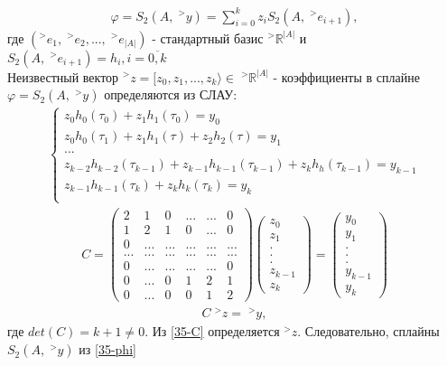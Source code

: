 \documentclass[__main__.tex]{subfiles}
\begin{document}
\begin{gather}
\varphi = S_2(A, \;^>y) = \sum_{i=0}^{k}{z_iS_2(A, \;^>e_{i+1})},
\label{35-phi}
\end{gather}
где $(^>e_1, \;^>e_2, ..., \;^>e_{|A|})$ - стандартный базис $^>\mathbb{R}^{|A|}$ и $S_2(A, \;^>e_{i+1}) = h_i, i=\overline{0, k}$\\
Неизвестный вектор $^>z = [z_0, z_1, ..., z_k \rangle \in \;^>\mathbb{R}^{|A|}$  - коэффициенты в сплайне $\varphi = S_2(A, \;^>y)$ определяются из СЛАУ:
\begin{gather*}
	\begin{cases}
		z_0h_0(\tau_0) + z_1h_1(\tau_0) = y_0\\
		z_0h_0(\tau_1) + z_1h_1(\tau) + z_2h_2(\tau) = y_1\\
		...\\
		z_{k-2}h_{k-2}(\tau_{k-1}) + z_{k-1}h_{k-1}(\tau_{k-1}) + z_kh_h(\tau_{k-1}) = y_{k-1}\\
		z_{k-1}h_{k-1}(\tau_k) + z_kh_k(\tau_k) = y_k\\
	\end{cases}
\end{gather*}
\begin{gather*}
C = 
\begin{pmatrix}
	2 & 1 & 0 & ... & ... & 0\\
	1 & 2 & 1 & 0 & ...  & 0\\
	0 & ... & ... & ... & ... & ...\\
	... & ... & ... & ... & ... & ...\\
	0 & ... & ... & ... & ... & 0\\
	0 & ... & 0 & 1 & 2 & 1\\
	0 & ... & 0 & 0 & 1 & 2
\end{pmatrix}
\begin{pmatrix}
	z_0\\
	z_1\\
	.\\
	.\\
	.\\
	z_{k-1}\\
	z_{k}
\end{pmatrix}
=
\begin{pmatrix}
	y_0\\
	y_1\\
	.\\
	.\\
	.\\
	y_{k-1}\\
	y_{k}
\end{pmatrix}
\end{gather*}
\begin{gather}
C\;^>z = \;^>y,
\label{35-C}
\end{gather}
где $det(C) = k + 1 \ne 0$. Из \ref{35-C} определяется $^>z$. Следовательно, сплайны $S_2(A,\;^>y)$ из \ref{35-phi}\\
\end{document}
